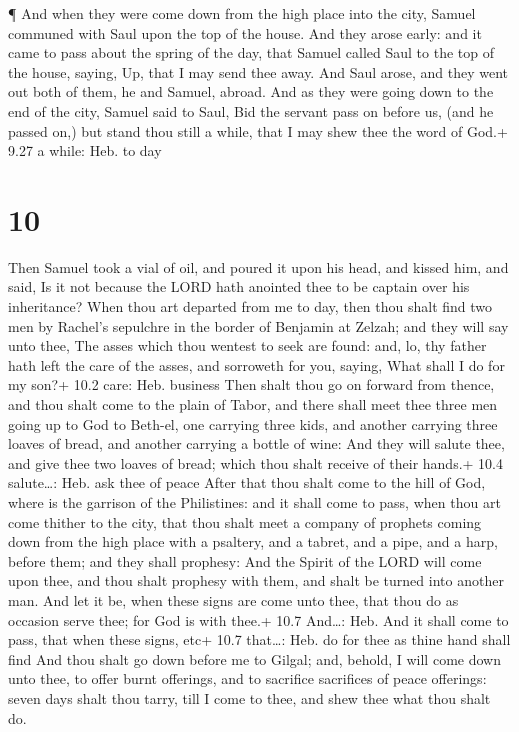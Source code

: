  ¶ And when they were come down from the high place into
the city, Samuel communed with Saul upon the top of the house.
 And they arose early: and it came to pass about the spring
of the day, that Samuel called Saul to the top of the house, saying, Up,
that I may send thee away. And Saul arose, and they went out both of
them, he and Samuel, abroad.  And as they were going down
to the end of the city, Samuel said to Saul, Bid the servant pass on
before us, (and he passed on,) but stand thou still a while, that I may
shew thee the word of God.+ 9.27 a while: Heb. to day

\hypertarget{section-9}{%
\section{10}\label{section-9}}

 Then Samuel took a vial of oil, and poured it upon his
head, and kissed him, and said, Is it not because the LORD hath anointed
thee to be captain over his inheritance?  When thou art
departed from me to day, then thou shalt find two men by Rachel's
sepulchre in the border of Benjamin at Zelzah; and they will say unto
thee, The asses which thou wentest to seek are found: and, lo, thy
father hath left the care of the asses, and sorroweth for you, saying,
What shall I do for my son?+ 10.2 care: Heb. business  Then
shalt thou go on forward from thence, and thou shalt come to the plain
of Tabor, and there shall meet thee three men going up to God to
Beth-el, one carrying three kids, and another carrying three loaves of
bread, and another carrying a bottle of wine:  And they will
salute thee, and give thee two loaves of bread; which thou shalt receive
of their hands.+ 10.4 salute\ldots: Heb. ask thee of peace 
After that thou shalt come to the hill of God, where is the garrison of
the Philistines: and it shall come to pass, when thou art come thither
to the city, that thou shalt meet a company of prophets coming down from
the high place with a psaltery, and a tabret, and a pipe, and a harp,
before them; and they shall prophesy:  And the Spirit of the
LORD will come upon thee, and thou shalt prophesy with them, and shalt
be turned into another man.  And let it be, when these signs
are come unto thee, that thou do as occasion serve thee; for God is with
thee.+ 10.7 And\ldots: Heb. And it shall come to pass, that when these
signs, etc+ 10.7 that\ldots: Heb. do for thee as thine hand shall find
 And thou shalt go down before me to Gilgal; and, behold, I
will come down unto thee, to offer burnt offerings, and to sacrifice
sacrifices of peace offerings: seven days shalt thou tarry, till I come
to thee, and shew thee what thou shalt do.

